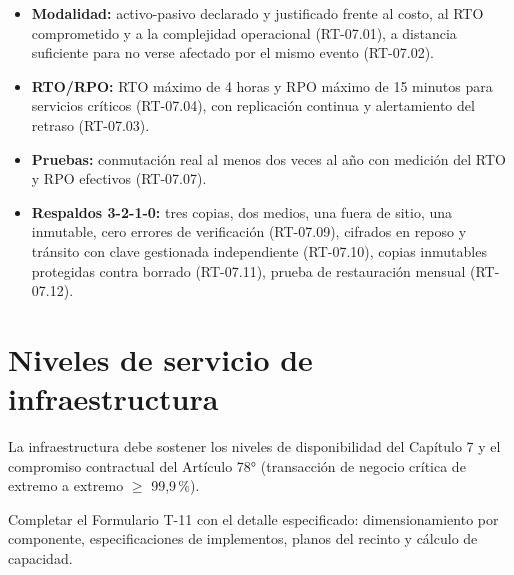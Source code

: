 \begin{itemize}
  \item \textbf{Modalidad:} activo-pasivo declarado y justificado frente al costo, al RTO
        comprometido y a la complejidad operacional (RT-07.01), a distancia suficiente
        para no verse afectado por el mismo evento (RT-07.02).
  \item \textbf{RTO/RPO:} RTO máximo de 4 horas y RPO máximo de 15 minutos para servicios
        críticos (RT-07.04), con replicación continua y alertamiento del retraso
        (RT-07.03).
  \item \textbf{Pruebas:} conmutación real al menos dos veces al año con medición del RTO
        y RPO efectivos (RT-07.07).
  \item \textbf{Respaldos 3-2-1-0:} tres copias, dos medios, una fuera de sitio, una
        inmutable, cero errores de verificación (RT-07.09), cifrados en reposo y tránsito
        con clave gestionada independiente (RT-07.10), copias inmutables protegidas contra
        borrado (RT-07.11), prueba de restauración mensual (RT-07.12).
\end{itemize}

\section{Niveles de servicio de infraestructura}

La infraestructura debe sostener los niveles de disponibilidad del Capítulo 7 y el
compromiso contractual del Artículo 78° (transacción de negocio crítica de extremo a
extremo $\geq$ 99,9\,\%).

\vspace{4pt}
{\small\color{lafroxGrato}\pendiente{} Completar el Formulario T-11 con el detalle
especificado: dimensionamiento por componente, especificaciones de implementos, planos
del recinto y cálculo de capacidad.}
